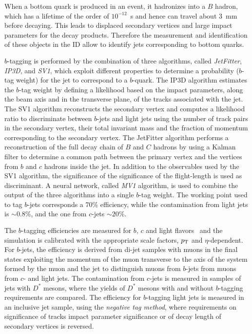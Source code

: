 When a bottom quark is produced in an event, it hadronizes into a $B$
hadron, which has a lifetime of the order of $10^{-12}$~s and hence
can travel about 3~mm before decaying.
This leads to displaced secondary vertices and large impact parameters
for the decay products. Therefore the measurement and identification
of these objects in the ID allow to identify jets corresponding to
bottom quarks.

$b$-tagging is performed by the combination of three algorithms,
called {\it JetFitter}, {\it IP3D}, and {\it SV1}, which exploit
different properties to determine a probability ($b$-tag weight) for
the jet to correspond to a $b$-quark.
The IP3D algorithm estimates the $b$-tag weight by defining a
likelihood based on the impact parameters, along the beam axis and in
the transverse plane, of the tracks associated with the jet.
The SV1 algorithm reconstructs the secondary vertex and computes a
likelihood ratio to discriminate between $b$-jets and light jets using
the number of track pairs in the secondary vertex, their total
invariant mass and the fraction of momentum corresponding to the
secondary vertex.
The JetFitter algorithm performs a reconstruction of the full decay
chain of $B$ and $C$ hadrons by using a Kalman filter to determine a
common path between the primary vertex and the vertices from $b$ and
$c$ hadrons inside the jet. In addition to the observables used by the
SV1 algorithm, the significance of the significance of the
flight-length is used as discriminant.
A neural network, called {\it MV1} algorithm, is used to combine the
output of the three algorithms into a single $b$-tag weight.
The working point used to tag $b$-jets corresponds a 70\% efficiency,
while the contamination from light jets is $\sim0.8\%$, and the one
from $c$-jets $\sim20\%$.

The $b$-tagging efficiencies are measured for 
$b$, $c$ and light flavors~\cite{btagging,ctagging,ltagging} and the
simulation is calibrated with the appropriate scale factors, $p_{\mathrm{T}}$ and
$\eta$-dependent.
For $b$-jets, the efficiency is derived from di-jet samples with
muons in the final states exploiting the momentum of the
muon transverse to the axis of the system formed by the muon and the jet
to distinguish muons from $b$-jets from muons from $c$- and light jets. 
The contamination from $c$-jets is measured in samples of jets with
$D^*$ mesons, where the yields of $D^*$ mesons with and without
$b$-tagging requirements are compared.
The efficiency for $b$-tagging light jets is measured in an inclusive
jet sample, using the {\it negative tag method}, where requirements on
significance of tracks impact parameter significance or of decay 
length of secondary vertices is reversed.

